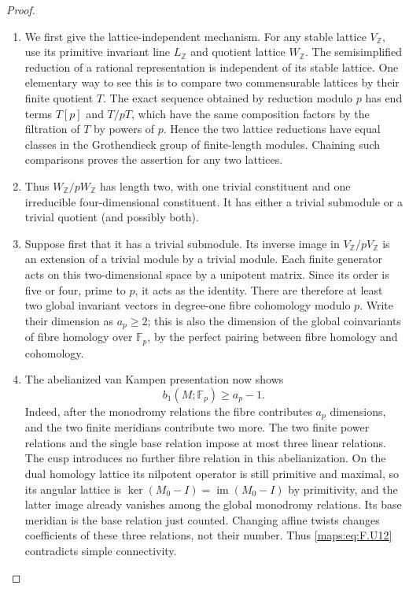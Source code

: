 \begin{proof}
\begin{enumerate}[label=\arabic*.]
\item We first give the lattice-independent mechanism.  For any
stable lattice $V_\mathbb Z$, use its primitive invariant
line $L_\mathbb Z$ and quotient lattice $W_\mathbb Z$.
The semisimplified reduction of a rational representation is
independent of its stable lattice.  One elementary way to see
this is to compare two commensurable lattices by their finite
quotient $T$.  The exact sequence obtained by reduction modulo
$p$ has end terms $T[p]$ and $T/pT$, which have the same
composition factors by the filtration of $T$ by powers of $p$.
Hence the two lattice reductions have equal classes in the
Grothendieck group of finite-length modules.  Chaining such
comparisons proves the assertion for any two lattices.

\item Thus $W_\mathbb Z/pW_\mathbb Z$ has length two, with one
trivial constituent and one irreducible four-dimensional
constituent.  It has either a trivial submodule or a trivial
quotient (and possibly both).

\item Suppose first that it has a trivial submodule.  Its inverse
image in $V_\mathbb Z/pV_\mathbb Z$ is an extension of a
trivial module by a trivial module.  Each finite generator
acts on this two-dimensional space by a unipotent matrix.
Since its order is five or four, prime to $p$, it acts as
the identity.  There are therefore at least two global
invariant vectors in degree-one fibre cohomology modulo $p$.
Write their dimension as $a_p\ge2$; this is also the
dimension of the global coinvariants of fibre homology over
$\mathbb F_p$, by the perfect pairing between fibre homology
and cohomology.

\item The abelianized van Kampen presentation now shows
\[
 b_1(M;\mathbb F_p)\ge a_p-1.
 \tag{F.U12}\label{maps:eq:F.U12}
\]
Indeed, after the monodromy relations the fibre contributes
$a_p$ dimensions, and the two finite meridians contribute
two more.  The two finite power relations and the single
base relation impose at most three linear relations.
The cusp introduces no further fibre relation in this
abelianization.  On the dual homology lattice its nilpotent
operator is still primitive and maximal, so its angular lattice is
$\ker(M_0-I)=\operatorname{im}(M_0-I)$ by primitivity, and
the latter image already vanishes among the global
monodromy relations.  Its base meridian is the base relation
just counted.  Changing affine twists changes coefficients
of these three relations, not their number.  Thus \eqref{maps:eq:F.U12}
contradicts simple connectivity.


\end{enumerate}
\end{proof}
